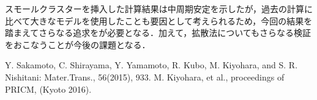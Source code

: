 \documentclass[a4j,twocolumn]{jsarticle}
\begin{document}
スモールクラスターを挿入した計算結果は中周期安定を示したが，過去の計算に比べて大きなモデルを使用したことも要因として考えられるため，今回の結果を踏まえてさらなる追求をが必要となる．加えて，拡散法についてもさらなる検証をおこなうことが今後の課題となる．
\vspace{0.2\baselineskip}

{\small\setlength\baselineskip{10pt}	%
\begin{thebibliography}{9}
Y. Sakamoto, C. Shirayama, Y. Yamamoto, R. Kubo, M. Kiyohara, and S. R. Nishitani: Mater.Trans., 56(2015), 933.
 M. Kiyohara, et al., proceedings of PRICM, (Kyoto 2016).
\end{thebibliography}
}
\end{document}
